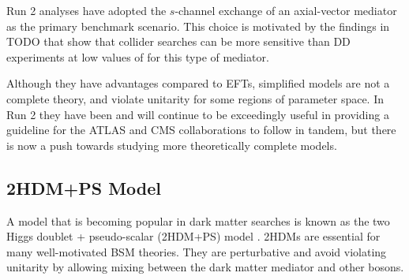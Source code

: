 


Run 2 analyses have adopted the $s$-channel exchange of an axial-vector mediator as the primary benchmark scenario. This choice is motivated by the findings in TODO that show that collider searches can be more sensitive than DD experiments at low values of \mchi for this type of mediator. 

Although they have advantages compared to EFTs, simplified models are not a complete theory, and violate unitarity for some regions of parameter space. In Run 2 they have been and will continue to be exceedingly useful in providing a guideline for the ATLAS and CMS collaborations to follow in tandem, but there is now a push towards studying more theoretically complete models.

\subsection{2HDM+PS Model}

A model that is becoming popular in \monoX dark matter searches is known as the two Higgs doublet + pseudo-scalar (2HDM+PS) model \cite{Bauer:2017ota}. 2HDMs are essential for many well-motivated BSM theories. They are perturbative and avoid violating unitarity by allowing mixing between the dark matter mediator and other bosons. 

